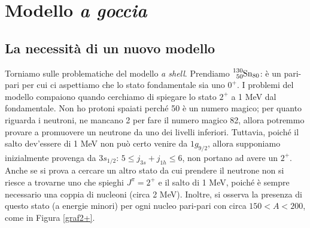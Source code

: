 \section{Modello \textit{a goccia}}
\subsection{La necessità di un nuovo modello}
Torniamo sulle problematiche del modello \textit{a shell}. Prendiamo $\ce{^{130}_{50}Sn_{80}}$: è un pari-pari per cui ci aspettiamo che lo stato fondamentale sia uno $0^+$. I problemi del modello compaiono quando cerchiamo di spiegare lo stato $2^+$ a 1 MeV dal fondamentale. Non ho protoni spaiati perché 50 è un numero magico; per quanto riguarda i neutroni, ne mancano 2 per fare il numero magico 82, allora potremmo provare a promuovere un neutrone da uno dei livelli inferiori. Tuttavia, poiché il salto dev'essere di 1 MeV non può certo venire da $1g_{9/2}$, allora supponiamo inizialmente provenga da $3s_{1/2}$: $5\leq j_{3s} + j_{1h}\leq6$, non portano ad avere un $2^+$. Anche se si prova a cercare un altro stato da cui prendere il neutrone non si riesce a trovarne uno che spieghi $J^\pi=2^+$ e il salto di 1 MeV, poiché è sempre necessario  una coppia di nucleoni (circa 2 MeV). Inoltre, si osserva la presenza di questo stato (a energie minori) per ogni nucleo pari-pari con circa $150<A<200$, come in Figura \ref{graf2+}.

